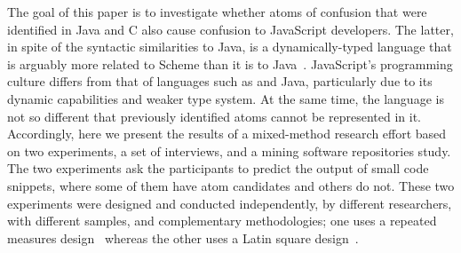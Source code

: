 The goal of this paper is to investigate whether atoms of confusion that were identified in Java and C also cause confusion to JavaScript developers. The latter, in spite of the syntactic similarities to Java, is a dynamically-typed language that is arguably more related to Scheme than it is to Java~\cite{Eich:2018:BHJ}. 
JavaScript's programming culture differs from that of languages such as \clang and Java, particularly due to its dynamic capabilities and weaker type system. At the same time, the language is not so different that previously identified atoms cannot be represented in it. 
Accordingly, here we present the results of a mixed-method research effort based on two experiments, a set of interviews, and a mining software repositories study. The two experiments ask the participants to predict the output of small code snippets, where some of them have atom candidates and others do not. These two experiments were designed and conducted independently, by different researchers, with different samples, and complementary methodologies; one uses a repeated measures design~\cite{Keselman:2001:ARM} whereas the other uses a Latin square design~\cite{Hunter-Experimenters}.  
